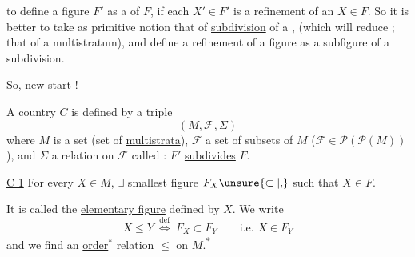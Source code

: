 to define a figure $F'$ as a \uline{} of $F$, if each $X'\in F'$  is a refinement of an $X\in F$. So it is better to take as primitive notion that of \uline{subdivision} of a  , (which will reduce ; that of a multistratum), and define a refinement of a figure as a subfigure of a subdivision.

So, new start !

A country $C$ is defined by a triple
\[
 (M,\mathcal F,\Sigma)
\]
where $ M$ is a set (set of \uline{multistrata}), $\mathcal F$ a set of subsets of $ M$ ($\mathcal F\in\mathcal P(\mathcal P(M))$),  and $\Sigma$ a relation on $\mathcal F$ called : $F'$ \uline{subdivides} $F$. 

\uline{C 1} For every $X\in M$, $\exists$  smallest  figure  $F_X\unsure{\subset|{,}}$ such that $X\in F$.

It is called the \uline{elementary figure} defined by $X$. We write
\[
 X\leq Y\ \overset{\mathrm{def}}{\Longleftrightarrow}\ F_X\subset F_Y\qquad\text{i.e. }X\in F_Y
\]
and we find an \uline{order}$^{*}$ relation $\leq$ on $ M$.\textsuperscript{$*$}
